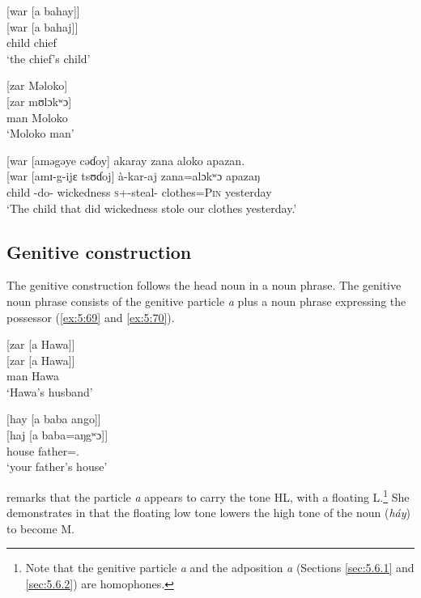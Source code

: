 \ea \label{ex:5:66}
{}[war  [a  bahay]]\\
\gll  {}[war  [a  bahaj]]\\
      child  {\GEN}  chief\\
\glt  ‘the chief’s child’
\z

\ea \label{ex:5:67}
{}[zar  Məloko]\\
\gll  {}[zar    mʊlɔkʷɔ]\\
      man    Moloko\\
\glt  ‘Moloko man’
\z

\ea \label{ex:5:68}
{}[war  [aməgəye  cəɗoy]  akaray  zana  aloko  apazan.\\
\gll  {}[war  [amɪ-g-ijɛ  tsʊɗoj]    à-kar-aj    zana=alɔkʷɔ  apazaŋ\\
      child  {\DEP}-do-{\CL}  wickedness  \textsc{s}+{\PFV}-steal{}-{\CL}  clothes=\textsc{Pin}  yesterday\\
\glt  ‘The child that did wickedness stole our clothes yesterday.’
\z

\subsection{Genitive construction}\label{sec:5.4.1}
\hypertarget{RefHeading1211741525720847}{}
The genitive construction follows the head noun in a noun phrase. The genitive noun phrase consists of the genitive particle \textit{a} plus a noun phrase expressing the possessor (\ref{ex:5:69} and \ref{ex:5:70}). 

\ea \label{ex:5:69}
{}[zar  [a  Hawa]]\\
\gll  {}[zar    [a  Hawa]]\\
      man    {\GEN}  Hawa\\
\glt  ‘Hawa’s husband’
\z

\ea \label{ex:5:70}
{}[hay  [a  baba  ango]]\\
\gll  {}[haj    [a  baba=aŋgʷɔ]]\\
      house  {\GEN}  father={\twoS}.{\POSS}\\
\glt  ‘your father’s house’
\z

\citet{Bow1997c} remarks that the particle \textit{a} appears to carry the tone HL, with a floating L.\footnote{Note that the genitive particle \textit{a} and the adposition \textit{a} (Sections \ref{sec:5.6.1} and \ref{sec:5.6.2}) are homophones.} She demonstrates in  that the floating low tone lowers the high tone of the noun (\textit{háy}) to become M. 

